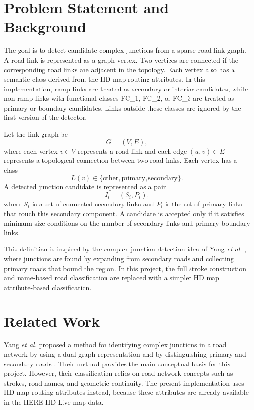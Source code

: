 \documentclass[conference]{IEEEtran}
\begin{document}
\section{Problem Statement and Background}

The goal is to detect candidate complex junctions from a sparse road-link graph. A road link is represented as a graph vertex. Two vertices are connected if the corresponding road links are adjacent in the topology. Each vertex also has a semantic class derived from the HD map routing attributes. In this implementation, ramp links are treated as secondary or interior candidates, while non-ramp links with functional classes FC\_1, FC\_2, or FC\_3 are treated as primary or boundary candidates. Links outside these classes are ignored by the first version of the detector.

Let the link graph be
\begin{equation}
G = (V, E),
\end{equation}
where each vertex $v \in V$ represents a road link and each edge $(u,v) \in E$ represents a topological connection between two road links. Each vertex has a class
\begin{equation}
L(v) \in \{\text{other}, \text{primary}, \text{secondary}\}.
\end{equation}
A detected junction candidate is represented as a pair
\begin{equation}
J_i = (S_i, P_i),
\end{equation}
where $S_i$ is a set of connected secondary links and $P_i$ is the set of primary links that touch this secondary component. A candidate is accepted only if it satisfies minimum size conditions on the number of secondary links and primary boundary links.

This definition is inspired by the complex-junction detection idea of Yang \textit{et al.} \cite{yang2021}, where junctions are found by expanding from secondary roads and collecting primary roads that bound the region. In this project, the full stroke construction and name-based road classification are replaced with a simpler HD map attribute-based classification.

\section{Related Work}

Yang \textit{et al.} proposed a method for identifying complex junctions in a road network by using a dual graph representation and by distinguishing primary and secondary roads \cite{yang2021}. Their method provides the main conceptual basis for this project. However, their classification relies on road-network concepts such as strokes, road names, and geometric continuity. The present implementation uses HD map routing attributes instead, because these attributes are already available in the HERE HD Live map data.
\end{document}
